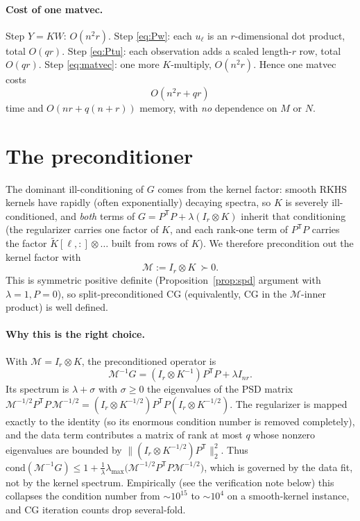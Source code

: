 \documentclass[12pt]{article}
\begin{document}
\paragraph{Cost of one matvec.}
Step $Y=KW$: $O(n^2r)$. Step \eqref{eq:Pw}: each $u_\ell$ is an $r$-dimensional
dot product, total $O(qr)$. Step \eqref{eq:Ptu}: each observation adds a scaled
length-$r$ row, total $O(qr)$. Step \eqref{eq:matvec}: one more $K$-multiply,
$O(n^2r)$. Hence one matvec costs
\begin{equation}\label{eq:matveccost}
  O(n^2 r + q r)
\end{equation}
time and $O(nr+q(n+r))$ memory, with \emph{no} dependence on $M$ or $N$.

\section{The preconditioner}

The dominant ill-conditioning of $G$ comes from the kernel factor: smooth RKHS
kernels have rapidly (often exponentially) decaying spectra, so $K$ is severely
ill-conditioned, and \emph{both} terms of $G=P^{\mathsf T}P+\lambda(I_r\otimes K)$
inherit that conditioning (the regularizer carries one factor of $K$, and each
rank-one term of $P^{\mathsf T}P$ carries the factor $\tilde K[\ell,:]\otimes\dots$
built from rows of $K$). We therefore precondition out the kernel factor with
\begin{equation}\label{eq:precond}
  \mathcal M := I_r\otimes K\ \succ0 .
\end{equation}
This is symmetric positive definite (Proposition~\ref{prop:spd} argument with
$\lambda=1,P=0$), so split-preconditioned CG (equivalently, CG in the
$\mathcal M$-inner product) is well defined.

\paragraph{Why this is the right choice.}
With $\mathcal M=I_r\otimes K$, the preconditioned operator is
\[
  \mathcal M^{-1}G
  =(I_r\otimes K^{-1})P^{\mathsf T}P+\lambda I_{nr}.
\]
Its spectrum is $\lambda+\sigma$ with $\sigma\ge0$ the eigenvalues of the PSD
matrix $\mathcal M^{-1/2}P^{\mathsf T}P\,\mathcal M^{-1/2}
=(I_r\otimes K^{-1/2})P^{\mathsf T}P(I_r\otimes K^{-1/2})$. The regularizer is
mapped exactly to the identity (so its enormous condition number is removed
completely), and the data term contributes a matrix of rank at most $q$ whose
nonzero eigenvalues are bounded by
$\|(I_r\otimes K^{-1/2})P^{\mathsf T}\|_2^2$. Thus
$\mathrm{cond}(\mathcal M^{-1}G)\le 1+\tfrac1\lambda\lambda_{\max}
\big(\mathcal M^{-1/2}P^{\mathsf T}P\mathcal M^{-1/2}\big)$, which is governed by
the data fit, not by the kernel spectrum. Empirically (see the verification note
below) this collapses the condition number from $\sim\!10^{15}$ to $\sim\!10^{4}$
on a smooth-kernel instance, and CG iteration counts drop several-fold.
\end{document}
